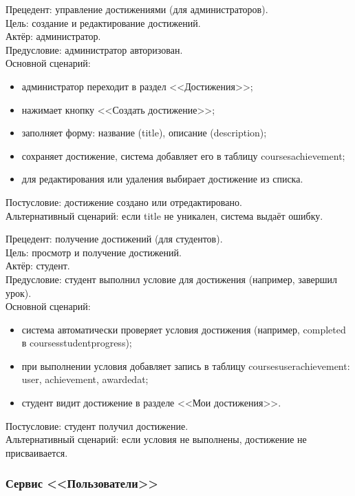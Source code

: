 {Прецедент: управление достижениями (для администраторов)}. \\
{Цель}: создание и редактирование достижений. \\
{Актёр}: администратор. \\
{Предусловие}: администратор авторизован. \\
{Основной сценарий}:
\begin{itemize}
	\item администратор переходит в раздел <<Достижения>>;
	\item нажимает кнопку <<Создать достижение>>;
	\item заполняет форму: название (title), описание (description);
	\item сохраняет достижение, система добавляет его в таблицу coursesachievement;
	\item для редактирования или удаления выбирает достижение из списка.
\end{itemize}
{Постусловие}: достижение создано или отредактировано. \\
{Альтернативный сценарий}: если title не уникален, система выдаёт ошибку.

{Прецедент: получение достижений (для студентов)}. \\
{Цель}: просмотр и получение достижений. \\
{Актёр}: студент. \\
{Предусловие}: студент выполнил условие для достижения (например, завершил урок). \\
{Основной сценарий}:
\begin{itemize}
	\item система автоматически проверяет условия достижения (например, completed в coursesstudentprogress);
	\item при выполнении условия добавляет запись в таблицу coursesuserachievement: user, achievement, awardedat;
	\item студент видит достижение в разделе <<Мои достижения>>.
\end{itemize}
{Постусловие}: студент получил достижение. \\
{Альтернативный сценарий}: если условия не выполнены, достижение не присваивается.

\subsubsection{Сервис <<Пользователи>>}

